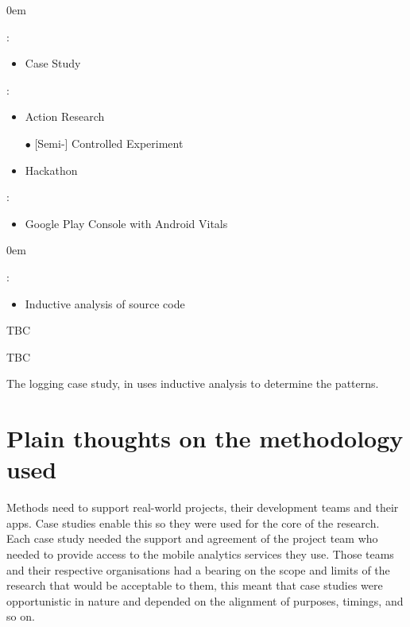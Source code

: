 {\footnotesize
\begin{description}
    \itemsep0em
    \item[Research Method] :
        \begin{itemize}
            \item Case Study
        \end{itemize}
    \item[Research Tools] :
    \begin{itemize}
        \itemsep0em
        \item Action Research
        \item[$\bullet$] [Semi-] Controlled Experiment
        \item Hackathon
    \end{itemize}
    \item[Analytics Provider] :
        \begin{itemize}
            \item Google Play Console with Android Vitals
        \end{itemize}
    \label{methodology-map-kiwix-case-study}    
\end{description}
}

{\footnotesize
\begin{description}
    \itemsep0em
    \item[Research  Method] :
        \begin{itemize}
            \item Inductive analysis of source code
        \end{itemize}
    \item[Research Tool] TBC
    \item[Data Analysis Method] TBC
    \label{methodology-map-logging-using-mobile-analytics}
\end{description}
}

The logging case study, in  uses inductive analysis to determine the patterns. 

\section*{Plain thoughts on the methodology used}
Methods need to support real-world projects, their development teams and their apps. Case studies enable this so they were used for the core of the research. Each case study needed the support and agreement of the project team who needed to provide access to the mobile analytics services they use. Those teams and their respective organisations had a bearing on the scope and limits of the research that would be acceptable to them, this meant that case studies were opportunistic in nature and depended on the alignment of purposes, timings, and so on.


